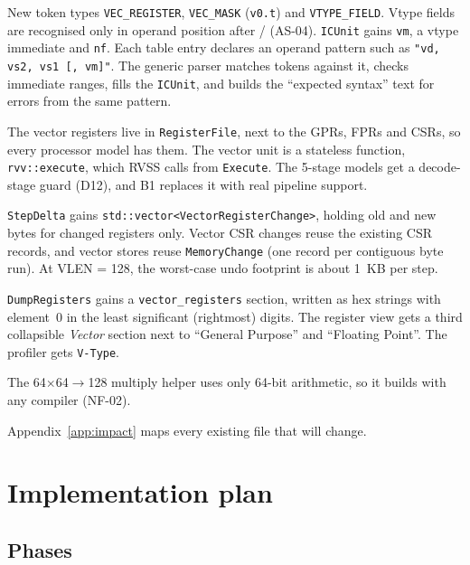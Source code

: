 \documentclass[11pt]{article}
\begin{document}
\begin{description}[style=sameline,leftmargin=0pt,font=\sffamily\bfseries\color{kblue}]
\item[Assembler.] New token types \texttt{VEC\_REGISTER}, \texttt{VEC\_MASK} (\texttt{v0.t}) and
  \texttt{VTYPE\_FIELD}. Vtype fields are recognised only in operand position after
  / (AS-04). \texttt{ICUnit} gains \texttt{vm}, a vtype immediate and
  \texttt{nf}. Each table entry declares an operand pattern such as
  \texttt{"vd, vs2, vs1 [, vm]"}. The generic parser matches tokens against it, checks immediate
  ranges, fills the \texttt{ICUnit}, and builds the ``expected syntax'' text for errors from the
  same pattern.
\item[Processor.] The vector registers live in \texttt{RegisterFile}, next to the GPRs, FPRs and
  CSRs, so every processor model has them. The vector unit is a stateless function,
  \texttt{rvv::execute}, which RVSS calls from \texttt{Execute}. The 5-stage models get a
  decode-stage guard (D12), and B1 replaces it with real pipeline support.
\item[Undo/redo.] \texttt{StepDelta} gains \texttt{std::vector<VectorRegisterChange>}, holding
  old and new bytes for changed registers only. Vector CSR changes reuse the existing CSR records,
  and vector stores reuse \texttt{MemoryChange} (one record per contiguous byte run). At VLEN = 128,
  the worst-case undo footprint is about 1~KB per step.
\item[Observability.] \texttt{DumpRegisters} gains a \texttt{vector\_registers} section, written
  as hex strings with element~0 in the least significant (rightmost) digits. The register view gets
  a third collapsible \emph{Vector} section next to ``General Purpose'' and ``Floating Point''. The
  profiler gets \texttt{V-Type}.
\item[Portability.] The 64$\times$64$\to$128 multiply helper uses only 64-bit arithmetic, so it
  builds with any compiler (NF-02).
\end{description}

Appendix~\ref{app:impact} maps every existing file that will change.

\section{Implementation plan}\label{sec:plan}

\subsection{Phases}
\end{document}
